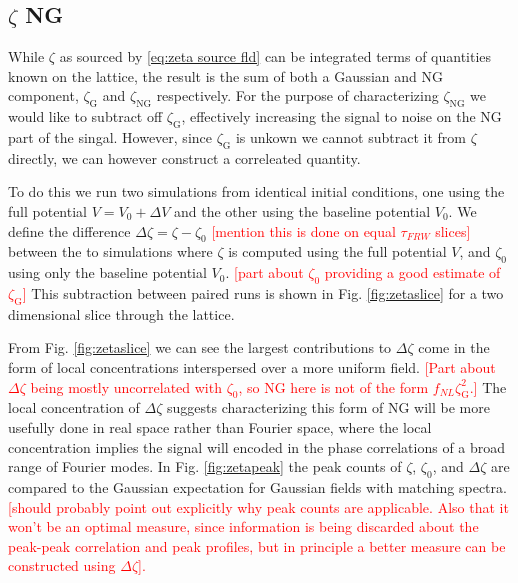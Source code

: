 
\subsection{$\zeta$ NG} \label{sec:zeta ng}
While $\zeta$ as sourced by \eqref{eq:zeta source fld} can be integrated terms of quantities known on the lattice, the result is the sum of both a Gaussian and NG component, $\zeta_\mathrm{G}$ and $\zeta_\mathrm{NG}$ respectively. For the purpose of characterizing $\zeta_\mathrm{NG}$ we would like to subtract off $\zeta_\mathrm{G}$, effectively increasing the signal to noise on the NG part of the singal. However, since $\zeta_\mathrm{G}$ is unkown we cannot subtract it from $\zeta$ directly, we can however construct a correleated quantity.

To do this we run two simulations from identical initial conditions, one using the full potential $V=V_0+\Delta V$ and the other using the baseline potential $V_0$. We define the difference $\Delta\zeta=\zeta-\zeta_0$ \textcolor{red}{[mention this is done on equal $\tau_{FRW}$ slices]} between the to simulations where $\zeta$ is computed using the full potential $V$, and $\zeta_0$ using only the baseline potential $V_0$. \textcolor{red}{[part about $\zeta_0$ providing a good estimate of $\zeta_\mathrm{G}$]} This subtraction between paired runs is shown in Fig. \ref{fig:zetaslice} for a two dimensional slice through the lattice.

From Fig. \ref{fig:zetaslice} we can see the largest contributions to $\Delta\zeta$ come in the form of local concentrations interspersed over a more uniform field. \textcolor{red}{[Part about $\Delta\zeta$ being mostly uncorrelated with $\zeta_0$, so NG here is not of the form $f_{NL}\zeta_\mathrm{G}^2$.]} The local concentration of $\Delta\zeta$ suggests characterizing this form of NG will be more usefully done in real space rather than Fourier space, where the local concentration implies the signal will encoded in the phase correlations of a broad range of Fourier modes. In Fig. \ref{fig:zetapeak} the peak counts of $\zeta$, $\zeta_0$, and $\Delta\zeta$ are compared to the Gaussian expectation for Gaussian fields with matching spectra. \textcolor{red}{[should probably point out explicitly why peak counts are applicable. Also that it won't be an optimal measure, since information is being discarded about the peak-peak correlation and peak profiles, but in principle a better measure can be constructed using $\Delta\zeta$].}

